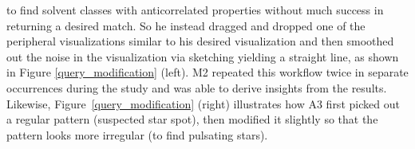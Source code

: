  to find solvent classes with anticorrelated
 properties without much success in returning a desired match.
 So he instead dragged and dropped one
 of the peripheral visualizations similar
 to his desired visualization and then smoothed
 out the noise in the visualization via sketching yielding
 a straight line,
 as shown in Figure \ref{query_modification} (left).
 M2 repeated this workflow twice in separate
 occurrences during the study and
 was able to derive insights from the results.
 Likewise, Figure~\ref{query_modification} (right)
 illustrates how A3 first picked out a regular pattern
 (suspected star spot), then modified it slightly
 so that the pattern looks more irregular (to find pulsating stars).
